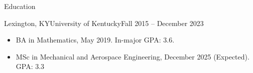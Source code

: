 \documentclass[]{mcdowellcv}
\begin{document}
\begin{cvsection}{Education}
  \begin{cvsubsection}{Lexington, KY}{University of Kentucky}{Fall 2015 -- December 2023}
    \begin{itemize}
      \item BA in Mathematics, May 2019. In-major GPA: 3.6.
      \item MSc in Mechanical and Aerospace Engineering, December 2025 (Expected). GPA: 3.3
    \end{itemize}
  \end{cvsubsection}
\end{cvsection}
\end{document}
